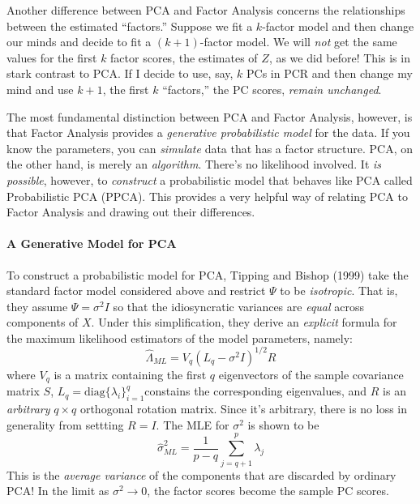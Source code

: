 \documentclass[12pt]{article}
\theoremstyle{definition}
\begin{document}
Another difference between PCA and Factor Analysis concerns the relationships between the estimated ``factors.'' Suppose we fit a $k$-factor model and then change our minds and decide to fit a $(k+1)$-factor model. We will \emph{not} get the same values for the first $k$ factor scores, the estimates of $Z$, as we did before! This is in stark contrast to PCA. If I decide to use, say, $k$ PCs in PCR and then change my mind and use $k+1$, the first $k$ ``factors,'' the PC scores, \emph{remain unchanged}. 

The most fundamental distinction between PCA and Factor Analysis, however, is that Factor Analysis provides a \emph{generative probabilistic model} for the data. If you know the parameters, you can \emph{simulate} data that has a factor structure. PCA, on the other hand, is merely an \emph{algorithm}. There's no likelihood involved. It \emph{is possible}, however, to \emph{construct} a probabilistic model that behaves like PCA called Probabilistic PCA (PPCA). This provides a very helpful way of relating PCA to Factor Analysis and drawing out their differences.

\paragraph{A Generative Model for PCA}
To construct a probabilistic model for PCA, Tipping and Bishop (1999) take the standard factor model considered above and restrict $\Psi$ to be \emph{isotropic}. That is, they assume $\Psi = \sigma^2 I$ so that the idiosyncratic variances are \emph{equal} across components of $X$. Under this simplification, they derive an \emph{explicit} formula for the maximum likelihood estimators of the model parameters, namely:
$$\widehat{\Lambda}_{ML} = V_q(L_q - \sigma^2 I)^{1/2}R$$
where $V_q$ is a matrix containing the first $q$ eigenvectors of the sample covariance matrix $S$, $L_q = \mbox{diag}\{\lambda_i\}_{i=1}^q $constains the corresponding eigenvalues, and $R$ is an \emph{arbitrary} $q\times q$ orthogonal rotation matrix. Since it's arbitrary, there is no loss in generality from settting $R = I$. The MLE for $\sigma^2$ is shown to be
	$$\widehat{\sigma}^2_{ML} = \frac{1}{p - q} \sum_{j=q+1}^p \lambda_j$$
This is the \emph{average variance} of the components that are discarded by ordinary PCA! In the limit as $\sigma^2 \rightarrow 0$, the factor scores become the sample PC scores.

\end{document}
